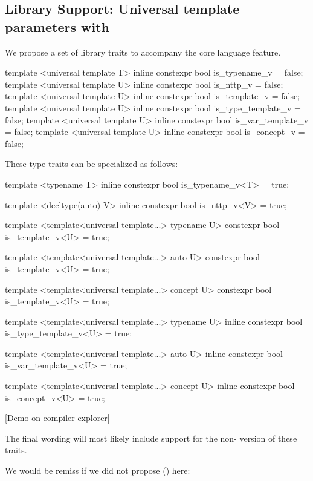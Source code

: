 \documentclass{wg21}
\begin{document}
\subsection{Library Support: Universal template parameters with }

We propose a set of library traits to accompany the core language feature.


\begin{colorblock}
template <universal template T>
inline constexpr bool is_typename_v = false;
template <universal template U>
inline constexpr bool is_nttp_v = false;
template <universal template U>
inline constexpr bool is_template_v = false;
template <universal template U>
inline constexpr bool is_type_template_v = false;
template <universal template U>
inline constexpr bool is_var_template_v = false;
template <universal template U>
inline constexpr bool is_concept_v = false;
\end{colorblock}

These type traits can be specialized as follows:

\begin{colorblock}
template <typename T>
inline constexpr bool is_typename_v<T> = true;

template <decltype(auto) V>
inline constexpr bool is_nttp_v<V> = true;

template <template<universal template...> typename U>
constexpr bool is_template_v<U> = true;

template <template<universal template...> auto U>
constexpr bool is_template_v<U> = true;

template <template<universal template...> concept U>
constexpr bool is_template_v<U> = true;

template <template<universal template...> typename U>
inline constexpr bool is_type_template_v<U> = true;

template <template<universal template...> auto U>
inline constexpr bool is_var_template_v<U> = true;

template <template<universal template...> concept U>
inline constexpr bool is_concept_v<U> = true;
\end{colorblock}

\href{https://godbolt.org/z/cEfvsaf4j}{[Demo on compiler explorer]}

The final wording will most likely include support for the non- version of these traits.

We would be remiss if we did not propose  () here:
\end{document}
